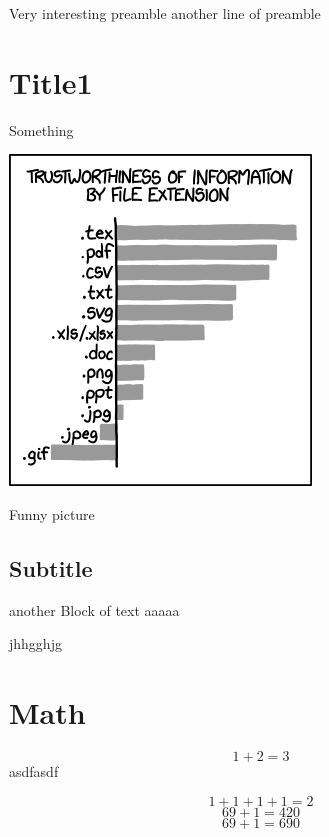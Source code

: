 Very interesting preamble
another line of preamble

\section{Title1}
Something

\includegraphics{image.png}
\caption{Funny picture}
\subsection{Subtitle}
another Block of text
aaaaa

jhhgghjg

\section{Math}
\label{math}
$$1+2 = 3$$
asdfasdf

\[1+1+1+1=2\]
\begin{displaymath}
69 + 1 = 420
\end{displaymath}
\begin{equation}
69 + 1 = 690
\end{equation}


